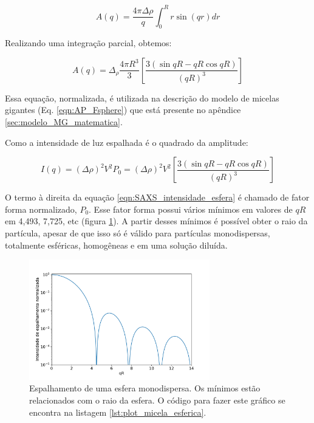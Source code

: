 		\begin{equation}
			A(q) = \dfrac{4\pi\Delta\rho}{q} \int_0^R r\sin(qr) dr
			\label{eqn:SAXS_amplitude_esfera}
		\end{equation}
				
		Realizando uma integração parcial, obtemos:
		
		\begin{equation}
			A(q) = \Delta_\rho \dfrac{4\pi R^3}{3} \left[ \dfrac{3 \left( \sin qR - qR \cos qR \right)}{\left(qR\right)^3} \right]
			\label{eqn:SAXS_amplitude_esfera_integrado}
		\end{equation}
		
		Essa equação, normalizada, é utilizada na descrição do modelo de micelas gigantes (Eq. \ref{eqn:AP_Fsphere}) que está presente no apêndice \ref{sec:modelo_MG_matematica}.
		
		Como a intensidade de luz espalhada é o quadrado da amplitude:
		
		\begin{equation}
			I(q) = (\Delta \rho)^2 V^2 P_0=(\Delta \rho)^2 V^2 \left[ \dfrac{3 \left( \sin qR - qR \cos qR \right)}{\left( qR \right) ^3} \right]
			\label{eqn:SAXS_intensidade_esfera}
		\end{equation}
		
		O termo à direita da equação \ref{eqn:SAXS_intensidade_esfera} é chamado de fator forma normalizado, \(P_0\). Esse fator forma possui vários mínimos em valores de \(qR\) em 4,493, 7,725, etc (figura \ref{fig:espalhamento_esfera}). A partir desses mínimos é possível obter o raio da partícula, apesar de que isso só é válido para partículas monodispersas, totalmente esféricas, homogêneas e em uma solução diluída.
		
		\begin{figure}[h]
			\centering
			\includegraphics[width=0.7\textwidth]{imagens/saxs/espalhamento_esfera_monodispersa}
			\caption{Espalhamento de uma esfera monodispersa. Os mínimos estão relacionados com o raio da esfera. O código para fazer este gráfico se encontra na listagem \ref{lst:plot_micela_esferica}.}
			\label{fig:espalhamento_esfera}
		\end{figure}
		
